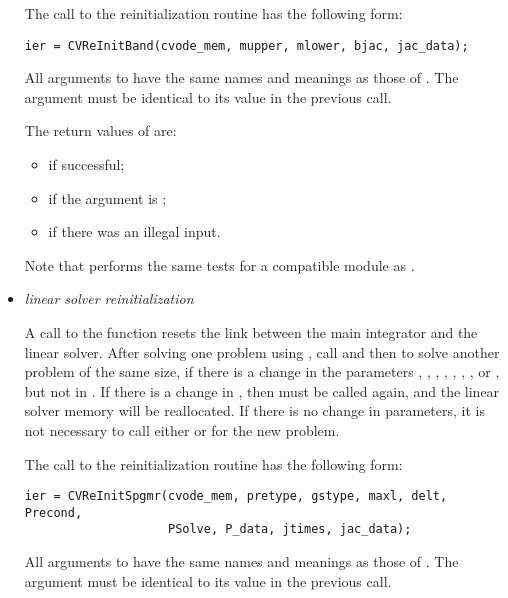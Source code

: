 \begin{itemize}
  The call to the {\cvband} reinitialization routine has the following form:
\begin{verbatim}
ier = CVReInitBand(cvode_mem, mupper, mlower, bjac, jac_data);
\end{verbatim}
  All arguments to  have the same names and meanings
  as those of .  The  argument must be identical 
  to its value in the previous  call.                     
  
  The return values of  are:
  \begin{itemize}
  \item {} if successful;
  \item {} if the  argument is ;
  \item {} if there was an illegal input.
  \end{itemize}         
  
  Note that  performs the same tests for a compatible {\nvector} 
  module as .  

\item {\em {\spgmr} linear solver reinitialization}
  
  A call to the  function resets the link between   
  the main {\cvode} integrator and the {\cvspgmr} linear solver.       
  After solving one problem using {\cvspgmr}, call  and then
   to solve another problem of the same size, if    
  there is a change in the  parameters , ,   
  , , , , , or 
  , but not in .  
  If there is a change in , then  must be      
  called again, and the linear solver memory will be reallocated.
  If there is no change in parameters, it is not necessary to    
  call either  or  for the new problem.

  The call to the {\cvspgmr} reinitialization routine has the following form:
\begin{verbatim}
ier = CVReInitSpgmr(cvode_mem, pretype, gstype, maxl, delt, Precond, 
                    PSolve, P_data, jtimes, jac_data);
\end{verbatim}
  All arguments to  have the same names and meanings
  as those of .  The  argument must be identical 
  to its value in the previous  call.                     
  

\end{itemize}
